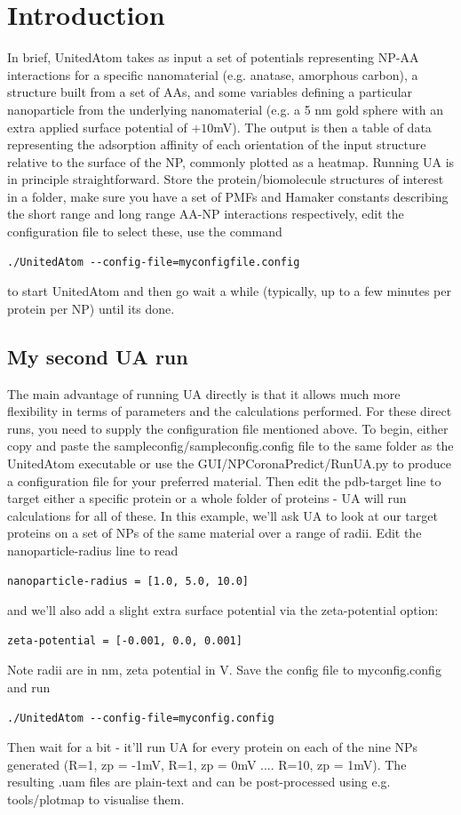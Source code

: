 \documentclass[10pt,a4paper,onecolumn]{report}
\begin{document}
 \section{Introduction}
 In brief, UnitedAtom takes as input a set of potentials representing NP-AA interactions for a specific nanomaterial (e.g. anatase, amorphous carbon), a structure built from a set of AAs, and some variables defining a particular nanoparticle from the underlying nanomaterial (e.g. a 5 nm gold sphere with an extra applied surface potential of $+10$mV). The output is then a table of data representing the adsorption affinity of each orientation of the input structure relative to the surface of the NP, commonly plotted as a heatmap.
  Running UA is in principle straightforward. Store the protein/biomolecule structures of interest in a folder, make sure you have a set of PMFs and Hamaker constants describing the short range and long range AA-NP interactions respectively, edit the configuration file to select these, use the command
\begin{lstlisting}
./UnitedAtom --config-file=myconfigfile.config
\end{lstlisting}
to start UnitedAtom and then go wait a while (typically, up to a few minutes per protein per NP) until its done. 


\subsection{My second UA run} \label{section:uaAdvanced}
The main advantage of running UA directly is that it allows much more flexibility in terms of parameters and the calculations performed. For these direct runs, you need to supply the configuration file mentioned above. 
To begin, either copy and paste the sample\textunderscore config/sample\textunderscore config.config file to the same folder as the UnitedAtom executable or use the GUI/NPCoronaPredict/RunUA.py to produce a configuration file for your preferred material. Then edit the pdb-target line to target either a specific protein or a whole folder of proteins - UA will run calculations for all of these.
In this example, we'll ask UA to look at our target proteins on a set of NPs of the same material over a range of radii. Edit the nanoparticle-radius line to read
\begin{lstlisting}
nanoparticle-radius = [1.0, 5.0, 10.0]
\end{lstlisting}
and we'll also add a slight extra surface potential via the zeta-potential option:
\begin{lstlisting}
zeta-potential = [-0.001, 0.0, 0.001] 
\end{lstlisting}
Note radii are in nm, zeta potential in V. Save the config file to myconfig.config and run
\begin{lstlisting}
./UnitedAtom --config-file=myconfig.config
\end{lstlisting}
Then wait for a bit - it'll run UA for every protein on each of the nine NPs generated (R=1, zp = -1mV, R=1, zp = 0mV .... R=10, zp = 1mV). The resulting .uam files are plain-text and can be post-processed using e.g. tools/plotmap to visualise them.
\end{document}
